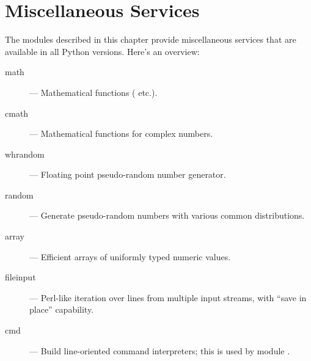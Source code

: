 \chapter{Miscellaneous Services}
\label{misc}

The modules described in this chapter provide miscellaneous services
that are available in all Python versions.  Here's an overview:

\begin{description}

\item[math]
--- Mathematical functions ( etc.).

\item[cmath]
--- Mathematical functions for complex numbers.

\item[whrandom]
--- Floating point pseudo-random number generator.

\item[random]
--- Generate pseudo-random numbers with various common distributions.

\item[array]
--- Efficient arrays of uniformly typed numeric values.

\item[fileinput]
--- Perl-like iteration over lines from multiple input streams, with
``save in place'' capability.

\item[cmd]
--- Build line-oriented command interpreters; this is used by module
.

\end{description}
